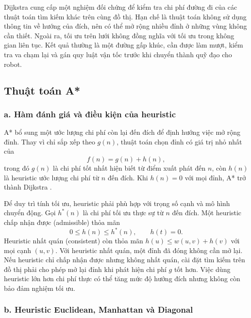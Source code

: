 \documentclass[12pt,a4paper,oneside]{report}
\begin{document}
Dijkstra cung cấp một nghiệm đối chứng để kiểm tra chi phí đường đi của các thuật toán tìm kiếm khác trên cùng đồ thị. Hạn chế là thuật toán không sử dụng thông tin về hướng của đích, nên có thể mở rộng nhiều đỉnh ở những vùng không cần thiết. Ngoài ra, tối ưu trên lưới không đồng nghĩa với tối ưu trong không gian liên tục. Kết quả thường là một đường gấp khúc, cần được làm mượt, kiểm tra va chạm lại và gán quy luật vận tốc trước khi chuyển thành quỹ đạo cho robot.

\subsection{Thuật toán A*}

\subsubsection*{a. Hàm đánh giá và điều kiện của heuristic}

A* bổ sung một ước lượng chi phí còn lại đến đích để định hướng việc mở rộng đỉnh. Thay vì chỉ sắp xếp theo \(g(n)\), thuật toán chọn đỉnh có giá trị nhỏ nhất của
\begin{equation}
  f(n)=g(n)+h(n),
  \label{eq:astar-score}
\end{equation}
trong đó \(g(n)\) là chi phí tốt nhất hiện biết từ điểm xuất phát đến \(n\), còn \(h(n)\) là heuristic ước lượng chi phí từ \(n\) đến đích. Khi \(h(n)=0\) với mọi đỉnh, A* trở thành Dijkstra \cite{lavalle-planning-2006}.

Để duy trì tính tối ưu, heuristic phải phù hợp với trọng số cạnh và mô hình chuyển động. Gọi \(h^{*}(n)\) là chi phí tối ưu thực sự từ \(n\) đến đích. Một heuristic chấp nhận được (admissible) thỏa mãn
\begin{equation}
  0\leq h(n)\leq h^{*}(n),\qquad h(t)=0.
\end{equation}
Heuristic nhất quán (consistent) còn thỏa mãn \(h(u)\leq w(u,v)+h(v)\) với mọi cạnh \((u,v)\). Với heuristic nhất quán, một đỉnh đã đóng không cần mở lại. Nếu heuristic chỉ chấp nhận được nhưng không nhất quán, cài đặt tìm kiếm trên đồ thị phải cho phép mở lại đỉnh khi phát hiện chi phí \(g\) tốt hơn. Việc dùng heuristic lớn hơn chi phí thực có thể tăng mức độ hướng đích nhưng không còn bảo đảm nghiệm tối ưu.

\subsubsection*{b. Heuristic Euclidean, Manhattan và Diagonal}
\end{document}

